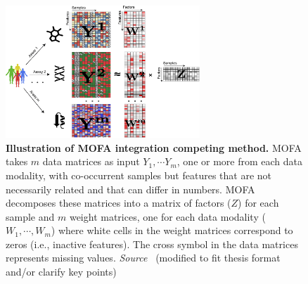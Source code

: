 \begin{description}
  \begin{figure}[!ht]
  	\centering
  	\includegraphics[width=0.65\textwidth]{Alg_MOFA/fig}
  	\vspace{0.1cm}
  	\caption[Illustration of MOFA integration competing method.]{\textbf{Illustration of MOFA integration competing method.} MOFA takes $m$ data matrices as input $Y_1, \cdots Y_m$, one or more from each data modality, with co-occurrent samples but features that are not necessarily related and that can differ in numbers. MOFA decomposes these matrices into a matrix of factors ($Z$) for each sample and $m$ weight matrices, one for each data modality ($W_1,\cdots, W_m$) where white cells in the weight matrices correspond to zeros (i.e., inactive features). The cross symbol in the data matrices represents missing values. \emph{Source~\cite{tewari2017mofa}} (modified to fit thesis format and/or clarify key points)
  }
  	\label{fig:Alg_MOFA}
  \end{figure}


\end{description}
